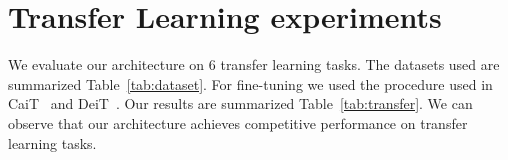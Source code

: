 								
\section{Transfer Learning experiments}
\label{sec:transfer}

We evaluate our architecture on 6 transfer learning tasks. The datasets used are summarized Table~\ref{tab:dataset}.  
For fine-tuning we used the procedure used in CaiT~\cite{touvron2021going} and DeiT~\cite{Touvron2020TrainingDI}.
Our results are summarized Table~\ref{tab:transfer}.
We can observe that our architecture achieves competitive performance on transfer learning tasks.

\begin{table}
\caption{Datasets used for our transfer learning tasks.  \label{tab:dataset}}
\centering
{}
\end{table}


